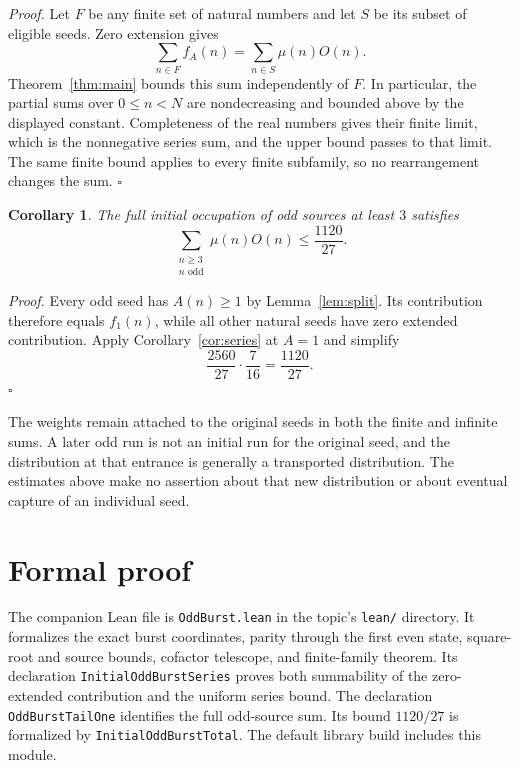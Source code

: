 \documentclass[11pt,letterpaper]{article}
\newtheorem{corollary}[theorem]{Corollary}
\newenvironment{proof}{\noindent\textit{Proof.}}{\hfill\(\square\)}
\begin{document}
\begin{proof}
Let \(F\) be any finite set of natural numbers and let \(S\) be its subset of eligible seeds. Zero extension gives
\[
\sum_{n\in F}f_A(n)=\sum_{n\in S}\mu(n)O(n).
\]
Theorem~\ref{thm:main} bounds this sum independently of \(F\). In particular, the partial sums over \(0\le n<N\) are nondecreasing and bounded above by the displayed constant. Completeness of the real numbers gives their finite limit, which is the nonnegative series sum, and the upper bound passes to that limit. The same finite bound applies to every finite subfamily, so no rearrangement changes the sum.
\end{proof}

\begin{corollary}
\label{cor:total}
The full initial occupation of odd sources at least \(3\) satisfies
\[
\sum_{\substack{n\ge3\\n\text{ odd}}}\mu(n)O(n)\le\frac{1120}{27}.
\]
\end{corollary}

\begin{proof}
Every odd seed has \(A(n)\ge1\) by Lemma~\ref{lem:split}. Its contribution therefore equals \(f_1(n)\), while all other natural seeds have zero extended contribution. Apply Corollary~\ref{cor:series} at \(A=1\) and simplify
\[
\frac{2560}{27}\cdot\frac7{16}=\frac{1120}{27}.
\]
\end{proof}

The weights remain attached to the original seeds in both the finite and infinite sums. A later odd run is not an initial run for the original seed, and the distribution at that entrance is generally a transported distribution. The estimates above make no assertion about that new distribution or about eventual capture of an individual seed.

\section{Formal proof}

The companion Lean file is \texttt{OddBurst.lean} in the topic's \texttt{lean/} directory. It formalizes the exact burst coordinates, parity through the first even state, square-root and source bounds, cofactor telescope, and finite-family theorem. Its declaration \texttt{InitialOddBurstSeries} proves both summability of the zero-extended contribution and the uniform series bound. The declaration \texttt{OddBurstTailOne} identifies the full odd-source sum. Its bound \(1120/27\) is formalized by \texttt{InitialOddBurstTotal}. The default library build includes this module.
\end{document}
